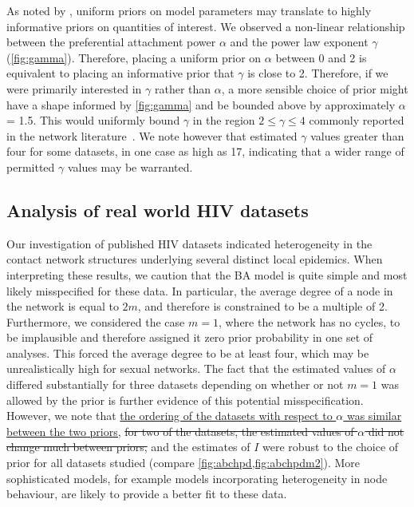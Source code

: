 \documentclass[12pt]{article}\usepackage[]{graphicx}\usepackage[]{color}
\let\mref\cref
\renewcommand{\cref}[1]{\mbox{\mref{#1}}}
\newcommand{\add}[1]{\color{blue} \uline{#1} \color{black}}
\newcommand{\del}[1]{\color{red} \sout{#1} \color{black}}
\begin{document}
As noted by \textcite{lintusaari2016identifiability}, uniform priors on model
parameters may translate to highly informative priors on quantities of
interest. We observed a non-linear relationship between the preferential
attachment power $\alpha$ and the power law exponent $\gamma$
(\cref{fig:gamma}). Therefore, placing a uniform prior on $\alpha$ between 0
and 2 is equivalent to placing an informative prior that $\gamma$ is close to
2. Therefore, if we were primarily interested in $\gamma$ rather than
$\alpha$, a more sensible choice of prior might have a shape informed by
\cref{fig:gamma} and be bounded above by approximately $\alpha$ = 1.5. This
would uniformly bound $\gamma$ in the region $2 \leq \gamma \leq 4$ commonly
reported in the network literature~\autocite{liljeros2001web,
schneeberger2004scale, colgate1989risk, brown2011transmission}. We note however
that \textcite{jones2003assessment} estimated $\gamma$ values greater than
four for some datasets, in one case as high as 17, indicating that a wider
range of permitted $\gamma$ values may be warranted.

\subsection*{Analysis of real world HIV datasets}

Our investigation of published HIV datasets indicated heterogeneity in the
contact network structures underlying several distinct local epidemics. When
interpreting these results, we caution that the BA model is quite simple and
most likely misspecified for these data. In particular, the average degree of a
node in the network is equal to $2m$, and therefore is constrained to be a
multiple of 2. Furthermore, we considered the case $m = 1$, where the network
has no cycles, to be implausible and therefore assigned it zero prior
probability in one set of analyses. This forced the average degree to be at
least four, which may be unrealistically high for sexual networks. The fact
that the estimated values of $\alpha$ differed substantially for three datasets
depending on whether or not $m = 1$ was allowed by the prior is further evidence
of this potential misspecification. However, we note that \add{the ordering of
the datasets with respect to $\alpha$ was similar between the two priors,}
\del{for two of the datasets, the estimated values of $\alpha$ did not change
much between priors,} and the estimates of $I$ were robust to the choice of
prior for all datasets studied (compare \cref{fig:abchpd,fig:abchpdm2}). More
sophisticated models, for example models incorporating heterogeneity in node
behaviour, are likely to provide a better fit to these data.
\end{document}
